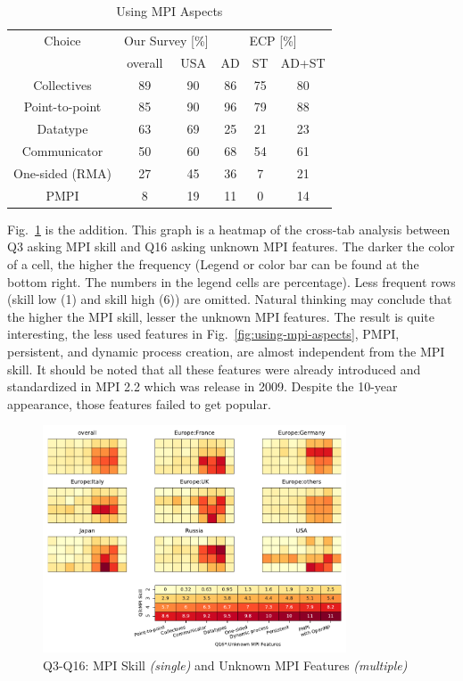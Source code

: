 \documentclass[conference,10pt,letterpaper]{IEEEtran}
\begin{document}
\begin{table}[htb]%
\begin{center}%
\caption{Using MPI Aspects}\label{tab:using-mpi-aspects}%
\begin{tabular}{c||c|c||c|c|c}%
\hline%
Choice & \multicolumn{2}{c||}{Our Survey [\%]} &
\multicolumn{3}{c}{ECP [\%]} \\
\cline{2-6}%
 & overall & USA & AD & ST & AD+ST \\
\hline%
Collectives & 89 & 90 & 86 & 75 & 80 \\
Point-to-point & 85 & 90 & 96 & 79 & 88 \\
Datatype & 63 & 69 & 25 & 21 & 23 \\
Communicator & 50 & 60 & 68 & 54 & 61 \\
One-sided (RMA) & 27 & 45 & 36 & 7 & 21 \\
PMPI & 8 & 19 & 11 & 0 & 14 \\
\hline%
\end{tabular}%
\end{center}%
\end{table}%

Fig.~\ref{fig:skill-and-aspects} is the addition. This graph is a
heatmap of the cross-tab analysis between Q3 asking MPI skill and Q16
asking unknown MPI features. The darker the color of a cell, the
higher the frequency (Legend or color bar can be found at the bottom
right. The numbers in the legend cells are percentage). Less frequent
rows (skill low (1) and  
skill high (6)) are omitted. Natural thinking may conclude
that the higher the MPI skill, lesser the unknown MPI features. The
result is quite interesting, the less used features in
Fig.~\ref{fig:using-mpi-aspects}, PMPI, persistent, and dynamic process
creation, are almost independent from the MPI skill.
It should be noted that all these features were already introduced
and standardized in MPI 2.2 which was release in 2009. Despite the
10-year appearance, those features failed to get popular.

  
\begin{figure}[htb]
\begin{center}
\includegraphics[width=9cm]{Figs/Q3-Q16.pdf}
\caption{Q3-Q16: MPI Skill {\it(single)} and Unknown MPI Features {\it(multiple)}}
\label{fig:skill-and-aspects}
\end{center}
\end{figure}
\end{document}
